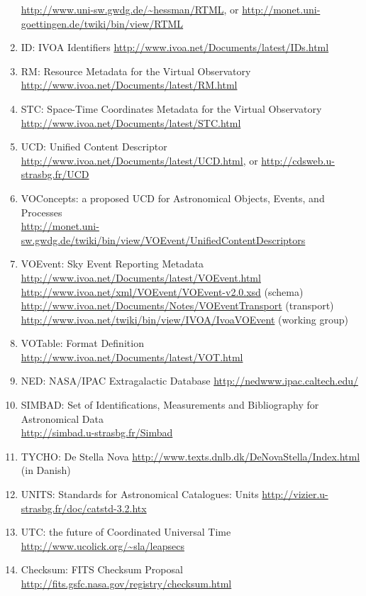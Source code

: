 \documentclass[11pt,a4paper]{ivoa}
\begin{document}
\begin{enumerate}
\url{http://www.uni-sw.gwdg.de/~hessman/RTML}, or \url{http://monet.uni-goettingen.de/twiki/bin/view/RTML}
\item\label{bib15} ID: IVOA Identifiers \url{http://www.ivoa.net/Documents/latest/IDs.html}
\item\label{bib16} RM: Resource Metadata for the Virtual Observatory \url{http://www.ivoa.net/Documents/latest/RM.html}
\item\label{bib17} STC: Space-Time Coordinates Metadata for the Virtual Observatory \url{http://www.ivoa.net/Documents/latest/STC.html} 
\item\label{bib18} UCD: Unified Content Descriptor \\
\url{http://www.ivoa.net/Documents/latest/UCD.html}, or \url{http://cdsweb.u-strasbg.fr/UCD}
\item\label{bib19} VOConcepts: a proposed UCD for Astronomical Objects, Events, and Processes \\
\url{http://monet.uni-sw.gwdg.de/twiki/bin/view/VOEvent/UnifiedContentDescriptors} 
\item\label{bib20} VOEvent: Sky Event Reporting Metadata\\
\url{http://www.ivoa.net/Documents/latest/VOEvent.html}\\
\url{http://www.ivoa.net/xml/VOEvent/VOEvent-v2.0.xsd} (schema)\\
\url{http://www.ivoa.net/Documents/Notes/VOEventTransport} (transport)\\
\url{http://www.ivoa.net/twiki/bin/view/IVOA/IvoaVOEvent} (working group)
\item\label{bib21} VOTable: Format Definition\\
\url{http://www.ivoa.net/Documents/latest/VOT.html} 
\item\label{bib22} NED: NASA/IPAC Extragalactic Database \url{http://nedwww.ipac.caltech.edu/}
\item\label{bib23} SIMBAD: Set of Identifications, Measurements and Bibliography for Astronomical Data\\
\url{http://simbad.u-strasbg.fr/Simbad}
\item\label{bib24} TYCHO: De Stella Nova \url{http://www.texts.dnlb.dk/DeNovaStella/Index.html} (in Danish) 
\item\label{bib25} UNITS: Standards for Astronomical Catalogues: Units \url{http://vizier.u-strasbg.fr/doc/catstd-3.2.htx}
\item\label{bib26} UTC: the future of Coordinated Universal Time \url{http://www.ucolick.org/~sla/leapsecs}
\item\label{bib27} Checksum: FITS Checksum Proposal \url{http://fits.gsfc.nasa.gov/registry/checksum.html}

\end{enumerate}
\end{document}
